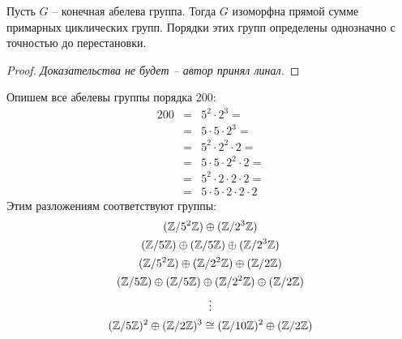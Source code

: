 \begin{theorem-nonna}
    Пусть $G$ -- конечная абелева группа. Тогда $G$ изоморфна
    прямой сумме примарных циклических групп. Порядки этих
    групп определены однозначно с точностью до перестановки.
\end{theorem-nonna}
\begin{proof}
    \textit{Доказательства не будет -- автор принял линал.}
\end{proof}
\begin{example}
    Опишем все абелевы группы порядка 200:
    \begin{eqnarray*}
        200 &=& 5^2 \cdot 2^3 = \\
            &=& 5 \cdot 5 \cdot 2^3 = \\
            &=& 5^2 \cdot 2^2 \cdot 2 = \\
            &=& 5 \cdot 5 \cdot 2^2 \cdot 2 = \\
            &=& 5^2 \cdot 2 \cdot 2 \cdot 2 = \\
            &=& 5 \cdot 5 \cdot 2 \cdot 2 \cdot 2
    \end{eqnarray*}
    Этим разложениям соответствуют группы:
    \begin{gather*}
        (\mathbb{Z}/5^2\mathbb{Z}) \oplus (\mathbb{Z}/2^3\mathbb{Z}) \\
        (\mathbb{Z}/5\mathbb{Z}) \oplus (\mathbb{Z}/5\mathbb{Z}) \oplus (\mathbb{Z}/2^3\mathbb{Z}) \\
        (\mathbb{Z}/5^2\mathbb{Z}) \oplus (\mathbb{Z}/2^2\mathbb{Z}) \oplus (\mathbb{Z}/2\mathbb{Z}) \\
        (\mathbb{Z}/5\mathbb{Z}) \oplus (\mathbb{Z}/5\mathbb{Z}) \oplus (\mathbb{Z}/2^2\mathbb{Z}) \oplus (\mathbb{Z}/2\mathbb{Z}) \\
        \vdots \\
        (\mathbb{Z}/5\mathbb{Z})^2 \oplus (\mathbb{Z}/2\mathbb{Z})^3 \cong (\mathbb{Z}/10\mathbb{Z})^2 \oplus (\mathbb{Z}/2\mathbb{Z})
    \end{gather*}
\end{example}
